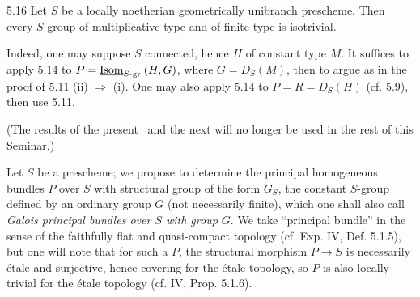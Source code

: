 \begin{theorem}{5.16}\label{X.5.16}
 Let $S$ be a locally noetherian geometrically unibranch prescheme. Then every $S$-group of multiplicative type and of finite type is isotrivial.
\end{theorem}
Indeed, one may suppose $S$ connected, hence $H$ of constant type $M$. It suffices to apply 5.14 to $P=\underline{\operatorname{Isom}}_{S\text{-}\mathrm{gr.}}(H,G)$, where $G=D_S(M)$, then to argue as in the proof of 5.11 (ii) $\Rightarrow$ (i). One may also apply 5.14 to $P=R=D_S(H)$ (cf. 5.9), then use 5.11.

(The results of the present \No\ and the next will no longer be used in the rest of this Seminar.)

Let $S$ be a prescheme; we propose to determine the principal homogeneous bundles $P$ over $S$ with structural group of the form $G_S$, the constant $S$-group defined by an ordinary group $G$ (not necessarily finite), which one shall also call \emph{Galois principal bundles over $S$ with group $G$}. We take ``principal bundle'' in the sense of the faithfully flat and quasi-compact topology (cf. Exp. IV, Def. 5.1.5), but one will note that for such a $P$, the structural morphism $P\to S$ is necessarily étale and surjective, hence covering for the étale topology, so $P$ is also locally trivial for the étale topology (cf. IV, Prop. 5.1.6).


